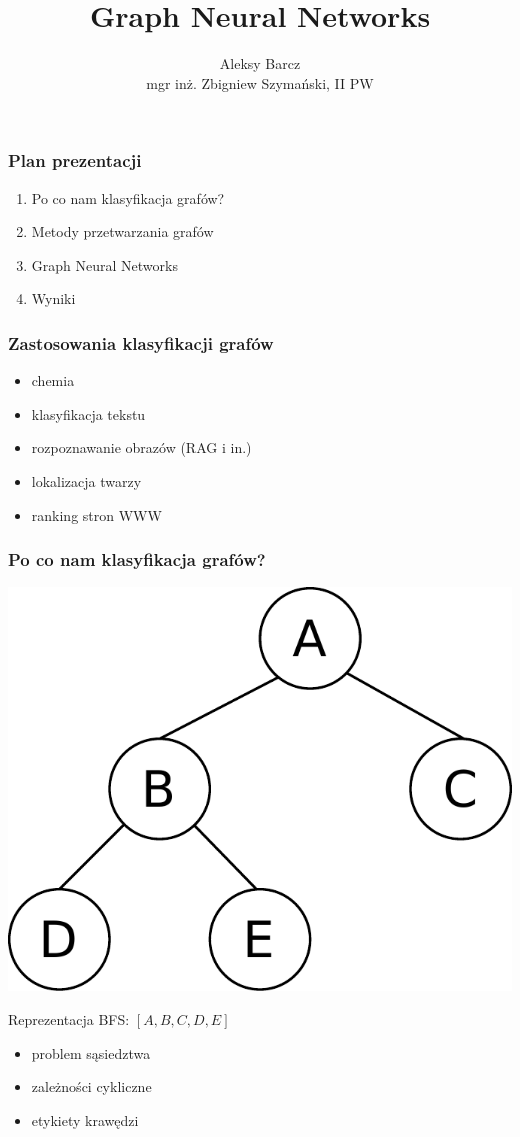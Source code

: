 \documentclass{beamer}
\author{Aleksy Barcz\\mgr inż. Zbigniew Szymański, II PW}
\title{Graph Neural Networks}
\begin{document}
\frame{\titlepage}

\begin{frame}
\frametitle{Plan prezentacji}
\begin{enumerate}
	\item Po co nam klasyfikacja grafów?
	\item Metody przetwarzania grafów
	\item Graph Neural Networks
	\item Wyniki
\end{enumerate}
\end{frame}

\begin{frame}
\frametitle{Zastosowania klasyfikacji grafów}
\begin{itemize}
	\item chemia
	\item klasyfikacja tekstu
	\item rozpoznawanie obrazów (RAG i in.)
	\item lokalizacja twarzy
	\item ranking stron WWW
\end{itemize}
\end{frame}

\begin{frame}
\frametitle{Po co nam klasyfikacja grafów?}
\begin{center}
	\includegraphics[scale=0.4]{img/tree}
\end{center}
Reprezentacja BFS: $[A, B, C, D, E]$
\begin{itemize}
	\item problem sąsiedztwa
	\item zależności cykliczne
	\item etykiety krawędzi
\end{itemize}
\end{frame}
\end{document}
